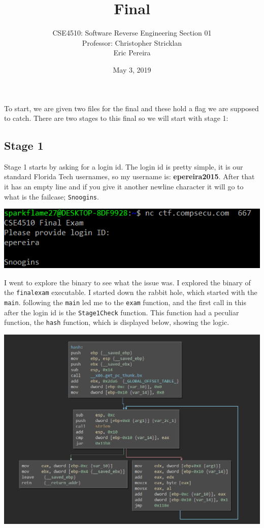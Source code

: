 \documentclass{article}
\title{Final}
\author{CSE4510: Software Reverse Engineering Section 01\\
	Professor: Christopher Stricklan \\
	Eric Pereira}
\date{May 3, 2019}
\newcommand\tab[1][.5cm]{\hspace*{#1}}
\begin{document}
	
	\maketitle
	
	\tab To start, we are given two files for the final and these hold a flag we are supposed to catch. There are two stages to this final so we will start with stage 1:
	
	\subsection*{Stage 1}
	\tab Stage 1 starts by asking for a login id. The login id is pretty simple, it is our standard 
	Florida Tech usernames, so my username is: \textbf{epereira2015}. After that it has an empty line and
	if you give it another newline character it will go to what is the failcase; \texttt{Snoogins}.
	\begin{center}
		\includegraphics[scale=0.5]{Stage1BlankFail.png}
	\end{center}
	\tab I went to explore the binary to see what the issue was. I explored the binary of the
	\texttt{finalexam} executable. I started down the rabbit hole, which started with the \texttt{main}.
	following the \texttt{main} led me to the \texttt{exam} function, and the first call in this after the
	login id is the \texttt{Stage1Check} function. This function had a peculiar function, the \texttt{hash}
	function, which is displayed below, showing the logic.
	\begin{center}
		\includegraphics[scale=.45]{hash.png}
	\end{center}
\end{document}
